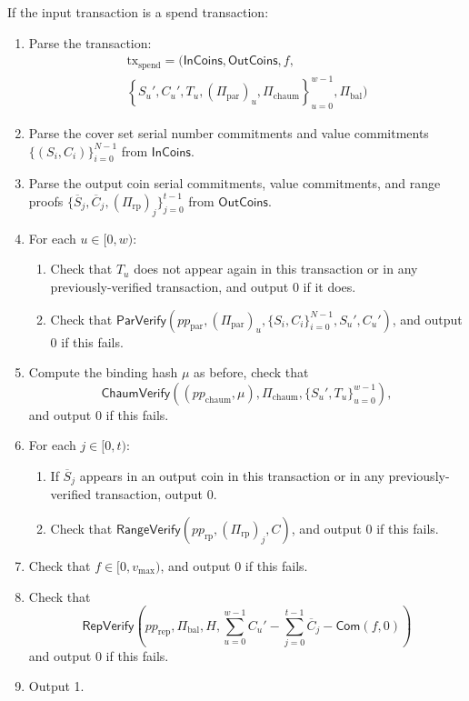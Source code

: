 \documentclass{llncs}
\newcommand{\func}[1]{\mathsf{#1}}
\newcommand{\com}{\func{Com}}
\begin{document}
If the input transaction is a spend transaction:
\begin{enumerate}
    \item Parse the transaction:
    \begin{multline*}
    \text{tx}_{\text{spend}} = ( \func{InCoins}, \func{OutCoins}, f, \\
    \left\{ S_u', C_u', T_u, (\Pi_{\text{par}})_u, \Pi_{\text{chaum}} \right\}_{u=0}^{w-1}, \Pi_{\text{bal}} )
    \end{multline*}
    \item Parse the cover set serial number commitments and value commitments $\{(S_i, C_i)\}_{i=0}^{N-1}$ from $\func{InCoins}$.
    \item Parse the output coin serial commitments, value commitments, and range proofs $\{ \overline{S}_j, \overline{C}_j, (\Pi_{\text{rp}})_j \}_{j=0}^{t-1}$ from $\func{OutCoins}$.
    \item For each $u \in [0,w):$
    \begin{enumerate}
        \item Check that $T_u$ does not appear again in this transaction or in any previously-verified transaction, and output 0 if it does.
        \item Check that $\func{ParVerify}(pp_{\text{par}},(\Pi_{\text{par}})_u,\{S_i,C_i\}_{i=0}^{N-1},S_u',C_u')$, and output 0 if this fails.
    \end{enumerate}
    \item Compute the binding hash $\mu$ as before, check that $$\func{ChaumVerify}((pp_{\text{chaum}},\mu),\Pi_{\text{chaum}},\{S_u',T_u\}_{u=0}^{w-1}),$$ and output 0 if this fails.
    \item For each $j \in [0,t)$:
    \begin{enumerate}
        \item If $\overline{S}_j$ appears in an output coin in this transaction or in any previously-verified transaction, output 0.
        \item Check that $\func{RangeVerify}(pp_{\text{rp}},(\Pi_{\text{rp}})_j,C)$, and output 0 if this fails.
    \end{enumerate}
    \item Check that $f \in [0,v_{\text{max}})$, and output 0 if this fails.
    \item Check that $$\func{RepVerify}\left( pp_{\text{rep}}, \Pi_{\text{bal}}, H, \sum_{u=0}^{w-1} C_u' - \sum_{j=0}^{t-1} \overline{C}_j - \com(f,0) \right)$$ and output 0 if this fails.
    \item Output 1.
\end{enumerate}
\end{document}
